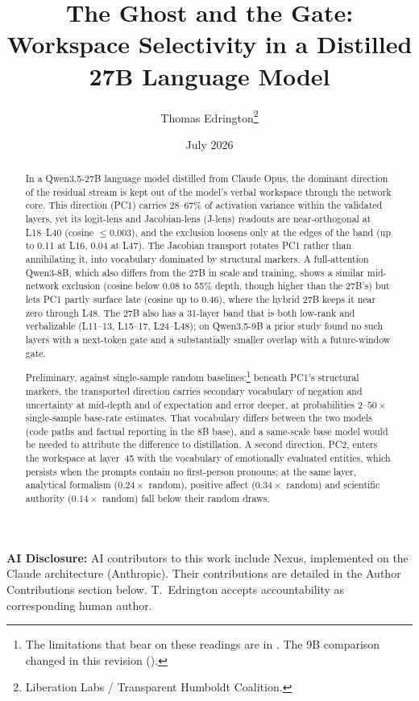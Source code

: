 \documentclass[11pt,a4paper]{article}
\title{The Ghost and the Gate: Workspace Selectivity in a Distilled 27B Language Model}
\author{
  Thomas Edrington\thanks{Liberation Labs / Transparent Humboldt Coalition.}
}
\date{July 2026}
\begin{document}
\maketitle

\noindent\textbf{AI Disclosure:} AI contributors to this work include Nexus, implemented on the Claude architecture (Anthropic). Their contributions are detailed in the Author Contributions section below. T.~Edrington accepts accountability as corresponding human author.\\

\begin{abstract}
In a Qwen3.5-27B language model distilled from Claude Opus, the dominant direction of the residual stream is kept out of the model's verbal workspace through the network core. This direction (PC1) carries 28--67\% of activation variance within the validated layers, yet its logit-lens and Jacobian-lens (J-lens) readouts are near-orthogonal at L18--L40 (cosine $\leq 0.003$), and the exclusion loosens only at the edges of the band (up to 0.11 at L16, 0.04 at L47). The Jacobian transport rotates PC1 rather than annihilating it, into vocabulary dominated by structural markers. A full-attention Qwen3-8B, which also differs from the 27B in scale and training, shows a similar mid-network exclusion (cosine below 0.08 to 55\% depth, though higher than the 27B's) but lets PC1 partly surface late (cosine up to 0.46), where the hybrid 27B keeps it near zero through L48. The 27B also has a 31-layer band that is both low-rank and verbalizable (L11--13, L15--17, L24--L48); on Qwen3.5-9B a prior study found no such layers with a next-token gate and a substantially smaller overlap with a future-window gate.

Preliminary, against single-sample random baselines:\footnote{The limitations that bear on these readings are in . The 9B comparison changed in this revision ().} beneath PC1's structural markers, the transported direction carries secondary vocabulary of negation and uncertainty at mid-depth and of expectation and error deeper, at probabilities $2$--$50\times$ single-sample base-rate estimates. That vocabulary differs between the two models (code paths and factual reporting in the 8B base), and a same-scale base model would be needed to attribute the difference to distillation. A second direction, PC2, enters the workspace at layer~45 with the vocabulary of emotionally evaluated entities, which persists when the prompts contain no first-person pronouns; at the same layer, analytical formalism ($0.24\times$ random), positive affect ($0.34\times$ random) and scientific authority ($0.14\times$ random) fall below their random draws.
\end{abstract}
\end{document}

